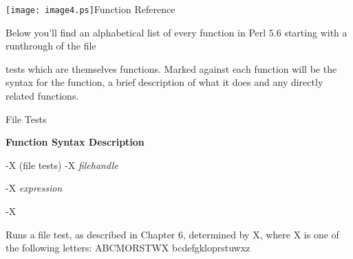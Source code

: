 \documentclass[a4paper,11pt]{book}
\begin{document}

\noindent 

\noindent 

\noindent 

\noindent 

\noindent 

\noindent 

\noindent 

\noindent 

\noindent 

\noindent 

\noindent 

\noindent 

\noindent 

\noindent 

\noindent 

\noindent \texttt{[image: image4.ps]}Function Reference

\noindent 

\noindent 

\noindent 

\noindent 

\noindent Below you'll find an alphabetical list of every function in Perl 5.6 starting with a runthrough of the file

\noindent tests which are themselves functions. Marked against each function will be the syntax for the function, a brief description of what it does and any directly related functions.

\noindent 

\noindent File Tests

\noindent 

\noindent \textbf{Function Syntax Description}

\noindent 

\noindent -X (file tests) -X \textit{filehandle}

\noindent 

\noindent -X \textit{expression}

\noindent 

\noindent -X

\noindent 

\noindent Runs a file test, as described in Chapter 6, determined by X, where X is one of the following letters: ABCMORSTWX bcdefgkloprstuwxz

\noindent 
\end{document}

